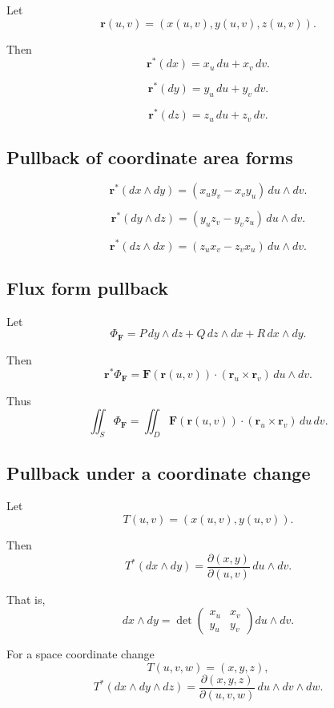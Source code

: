 Let
\[
    \mathbf r(u,v)=(x(u,v),y(u,v),z(u,v)).
\]

Then
\[
\boxed{
    \mathbf r^*(dx)=x_u\,du+x_v\,dv.
}
\]

\[
\boxed{
    \mathbf r^*(dy)=y_u\,du+y_v\,dv.
}
\]

\[
\boxed{
    \mathbf r^*(dz)=z_u\,du+z_v\,dv.
}
\]

\subsection*{Pullback of coordinate area forms}

\[
\boxed{
    \mathbf r^*(dx\wedge dy)
    =
    (x_u y_v-x_v y_u)\,du\wedge dv.
}
\]

\[
\boxed{
    \mathbf r^*(dy\wedge dz)
    =
    (y_u z_v-y_v z_u)\,du\wedge dv.
}
\]

\[
\boxed{
    \mathbf r^*(dz\wedge dx)
    =
    (z_u x_v-z_v x_u)\,du\wedge dv.
}
\]

\subsection*{Flux form pullback}

Let
\[
    \Phi_{\mathbf F}
    =
    P\,dy\wedge dz
    +
    Q\,dz\wedge dx
    +
    R\,dx\wedge dy.
\]

Then
\[
\boxed{
    \mathbf r^*\Phi_{\mathbf F}
    =
    \mathbf F(\mathbf r(u,v))
    \cdot
    (\mathbf r_u\times\mathbf r_v)
    \,du\wedge dv.
}
\]

Thus
\[
\boxed{
    \iint_S \Phi_{\mathbf F}
    =
    \iint_D
    \mathbf F(\mathbf r(u,v))
    \cdot
    (\mathbf r_u\times\mathbf r_v)
    \,du\,dv.
}
\]

\subsection*{Pullback under a coordinate change}

Let
\[
    T(u,v)=(x(u,v),y(u,v)).
\]

Then
\[
\boxed{
    T^*(dx\wedge dy)
    =
    \frac{\partial(x,y)}{\partial(u,v)}
    \,du\wedge dv.
}
\]

That is,
\[
\boxed{
    dx\wedge dy
    =
    \det
    \begin{pmatrix}
    x_u&x_v\\
    y_u&y_v
    \end{pmatrix}
    du\wedge dv.
}
\]

For a space coordinate change
\[
    T(u,v,w)=(x,y,z),
\]
\[
\boxed{
    T^*(dx\wedge dy\wedge dz)
    =
    \frac{\partial(x,y,z)}{\partial(u,v,w)}
    \,du\wedge dv\wedge dw.
}
\]

